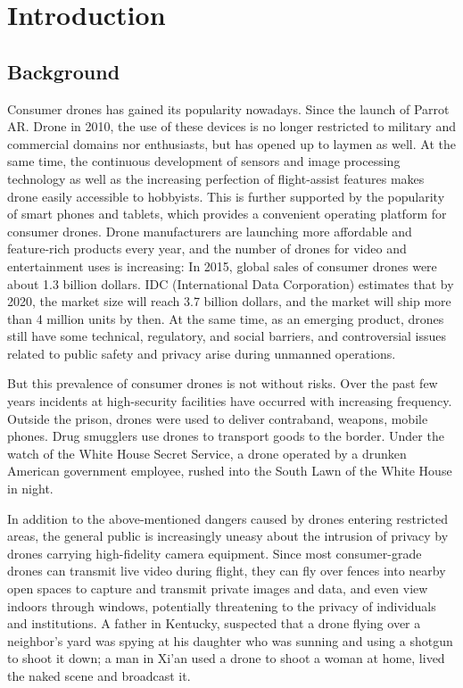 \documentclass{sig-alternate-10pt}
\begin{document}

\section{Introduction}
\subsection{Background}
Consumer drones has gained its popularity nowadays. Since the launch of Parrot AR. Drone in 2010, the use of these devices is no longer restricted to military and commercial domains nor enthusiasts, but has opened up to laymen as well. At the same time, the continuous development of sensors and image processing technology as well as the increasing perfection of flight-assist features makes drone easily accessible to hobbyists. This is further supported by the popularity of smart phones and tablets, which provides a convenient operating platform for consumer drones. Drone manufacturers are launching more affordable and feature-rich products every year, and the number of drones for video and entertainment uses is increasing: In 2015, global sales of consumer drones were about 1.3 billion dollars. IDC (International Data Corporation) estimates that by 2020, the market size will reach 3.7 billion dollars, and the market will ship more than 4 million units by then. At the same time, as an emerging product, drones still have some technical, regulatory, and social barriers, and controversial issues related to public safety and privacy arise during unmanned operations.

But this prevalence of consumer drones is not without risks. Over the past few years incidents at high-security facilities have occurred with increasing frequency. Outside the prison, drones were used to deliver contraband, weapons, mobile phones. Drug smugglers use drones to transport goods to the border. Under the watch of the White House Secret Service, a drone operated by a drunken American government employee, rushed into the South Lawn of the White House in night.

In addition to the above-mentioned dangers caused by drones entering restricted areas, the general public is increasingly uneasy about the intrusion of privacy by drones carrying high-fidelity camera equipment. Since most consumer-grade drones can transmit live video during flight, they can fly over fences into nearby open spaces to capture and transmit private images and data, and even view indoors through windows, potentially threatening to the privacy of individuals and institutions. A father in Kentucky, suspected that a drone flying over a neighbor's yard was spying at his daughter who was sunning and using a shotgun to shoot it down; a man in Xi'an used a drone to shoot a woman at home, lived the naked scene and broadcast it.
 
\end{document}
